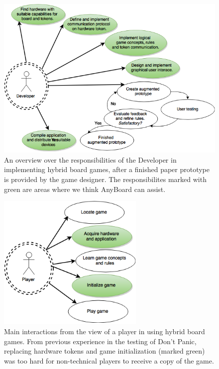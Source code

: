 \begin{figure}[ht]
\includegraphics[width=12cm]{img/LifeCycleDeveloper}
\centering
\caption{An overview over the responsibilities of the Developer in implementing hybrid board games, after a finished paper prototype is provided by the game designer. The responsibilites marked with green are areas where we think AnyBoard can assist.}
\label{fig:LifeCycleDeveloper}
\end{figure}

\begin{figure}[ht]
\includegraphics[width=7cm]{img/LifeCyclePlayer}
\centering
\caption{Main interactions from the view of a player in using hybrid board games. From previous experience in the testing of Don't Panic, replacing hardware tokens and game initialization (marked green) was too hard for non-technical players to receive a copy of the game.}
\label{fig:LifeCyclePlayer}
\end{figure}

